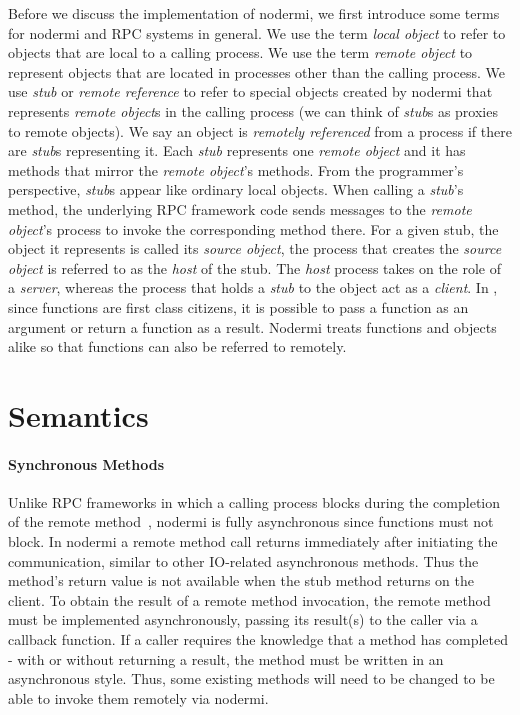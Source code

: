 Before we discuss the implementation of nodermi,
we first introduce some terms for nodermi and
RPC systems in general.
We use the term \emph{local object}
to refer to objects that are local to a calling process.
We use the term \emph{remote object} to represent objects that are
located in processes other than the calling process.
We use \emph{stub} or \emph{remote reference} to refer to special objects created
by nodermi that represents \emph{remote object}s in the calling process
(we can think of \emph{stub}s as proxies to remote objects).
We say an object is \emph{remotely referenced} from a process
if there are \emph{stub}s representing it.
Each \emph{stub} represents one \emph{remote object} and
it has methods that mirror the \emph{remote object}'s methods.
From the programmer's perspective,
\emph{stub}s appear like ordinary local objects.
When calling a \emph{stub}'s method, the underlying
RPC framework code sends messages to the \emph{remote object}'s process
to invoke the corresponding method there.
For a given stub,
the object it represents is called its \emph{source object},
the process that creates the \emph{source object}
is referred to as the \emph{host} of the stub. 
The \emph{host} process takes on the role of a \emph{server}, 
whereas the process that holds a \emph{stub} to the object act as a \emph{client}.
In \js{}, since functions are first class citizens, it is possible
to pass a function as an argument or return a function as a result.
Nodermi treats functions and objects alike so that functions can also be
referred to remotely.

\section{Semantics}

\nodermiexamplefig{}

\paragraph{Synchronous Methods}
Unlike RPC frameworks in which a calling process blocks during the
completion of the remote method~\cite{birrell1984implementing},
nodermi is fully asynchronous since \js{} functions must not block.
In nodermi a remote method call returns immediately after initiating the communication,
similar to other IO-related asynchronous methods.
Thus the method's return value is not available when the stub method returns on the client.
To obtain the result of a remote method invocation,
the remote method must be implemented asynchronously,
passing its result(s) to the caller via a callback function.
If a caller requires the knowledge that a method has completed - with or without
returning a result, the method must be written in an asynchronous style.
Thus, some existing methods will need to be changed to be able to invoke them 
remotely via nodermi.

